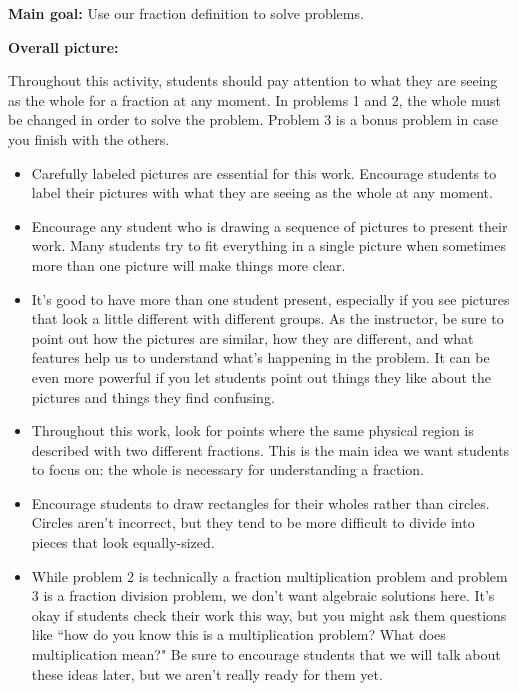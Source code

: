 \documentclass[nooutcomes,noauthor, handout]{ximera}
\begin{document}
\begin{instructorNotes} 



{\bf Main goal:} Use our fraction definition to solve problems.

{\bf Overall picture:} 

Throughout this activity, students should pay attention to what they are seeing as the whole for a fraction at any moment. In problems 1 and 2, the whole must be changed in order to solve the problem. Problem 3 is a bonus problem in case you finish with the others. 

\begin{itemize}
	\item Carefully labeled pictures are essential for this work. Encourage students to label their pictures with what they are seeing as the whole at any moment.
	\item Encourage any student who is drawing a sequence of pictures to present their work. Many students try to fit everything in a single picture when sometimes more than one picture will make things more clear.
	\item It's good to have more than one student present, especially if you see pictures that look a little different with different groups. As the instructor, be sure to point out how the pictures are similar, how they are different, and what features help us to understand what's happening in the problem. It can be even more powerful if you let students point out things they like about the pictures and things they find confusing.
	\item Throughout this work, look for points where the same physical region is described with two different fractions. This is the main idea we want students to focus on: the whole is necessary for understanding a fraction.
	\item Encourage students to draw rectangles for their wholes rather than circles. Circles aren't incorrect, but they tend to be more difficult to divide into pieces that look equally-sized.
	\item While problem 2 is technically a fraction multiplication problem and problem 3 is a fraction division problem, we don't want algebraic solutions here. It's okay if students check their work this way, but you might ask them questions like ``how do you know this is a multiplication problem? What does multiplication mean?" Be sure to encourage students that we will talk about these ideas later, but we aren't really ready for them yet.
\end{itemize}



\end{instructorNotes}
\end{document}
